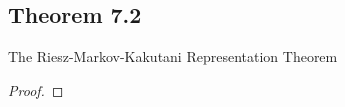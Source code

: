 \documentclass[../../main.tex]{subfiles}
\begin{document}
\subsection{Theorem 7.2}
\begin{wts}
    The Riesz-Markov-Kakutani Representation Theorem
\end{wts}
\begin{proof}

\end{proof}
\end{document}
